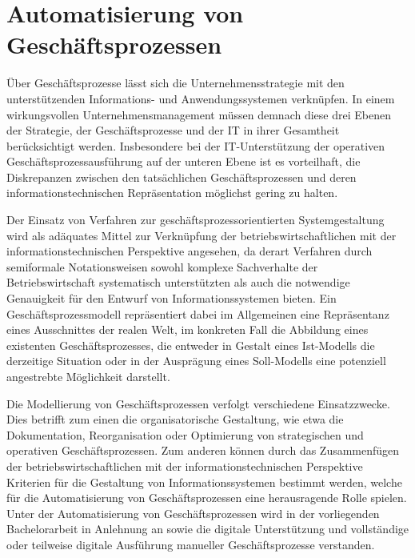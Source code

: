 \section{Automatisierung von Geschäftsprozessen}\label{sec:Automatisierung}
Über Geschäftsprozesse lässt sich die Unternehmensstrategie mit den unterstützenden Informations- und Anwendungssystemen verknüpfen.
In einem wirkungsvollen Unternehmensmanagement müssen demnach diese drei Ebenen der Strategie, der Geschäftsprozesse und der \ac{IT} in ihrer Gesamtheit berücksichtigt werden.
\cite{Scheer.1991}
Insbesondere bei der \ac{IT}-Unterstützung der operativen Geschäftsprozessausführung auf der unteren Ebene ist es vorteilhaft, die Diskrepanzen zwischen den tatsächlichen Geschäftsprozessen und deren informationstechnischen Repräsentation möglichst gering zu halten.
\cite{Gadatsch.2013}

Der Einsatz von Verfahren zur geschäftsprozessorientierten Systemgestaltung wird als adäquates Mittel zur Verknüpfung der betriebswirtschaftlichen mit der informationstechnischen Perspektive angesehen, da derart Verfahren durch semiformale Notationsweisen sowohl komplexe Sachverhalte der Betriebswirtschaft systematisch unterstützten als auch die notwendige Genauigkeit für den Entwurf von Informationssystemen bieten.
\cite{Staud.2006}
Ein Geschäftsprozessmodell repräsentiert dabei im Allgemeinen eine Repräsentanz eines Ausschnittes der realen Welt, im konkreten Fall die Abbildung eines existenten Geschäftsprozesses, die entweder in Gestalt eines Ist-Modells die derzeitige Situation oder in der Ausprägung eines Soll-Modells eine potenziell angestrebte Möglichkeit darstellt.
\cite{Becker.2012}

Die Modellierung von Geschäftsprozessen verfolgt verschiedene Einsatzzwecke.
Dies betrifft zum einen die organisatorische Gestaltung, wie etwa die Dokumentation, Reorganisation oder Optimierung von strategischen und operativen Geschäftsprozessen. 
Zum anderen können durch das Zusammenfügen der betriebswirtschaftlichen mit der informationstechnischen Perspektive Kriterien für die Gestaltung von Informationssystemen bestimmt werden, welche für die Automatisierung von Geschäftsprozessen eine herausragende Rolle spielen.
\cite{Scheer.2017}
Unter der Automatisierung von Geschäftsprozessen wird in der vorliegenden Bachelorarbeit in Anlehnung an \citeauthor{Abolhassan.2016} \cite{Abolhassan.2016} sowie \citeauthor{Jobst.2010} \cite{Jobst.2010} die digitale Unterstützung und vollständige oder teilweise digitale Ausführung manueller Geschäftsprozesse verstanden.

